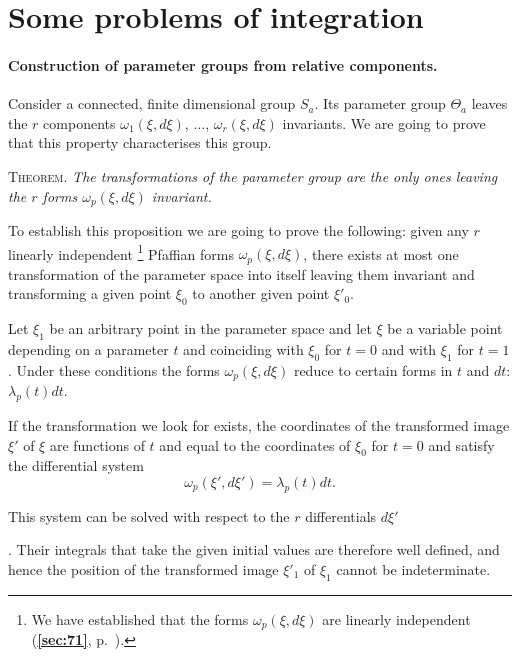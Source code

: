 \documentclass[leqno,11pt]{book}
\numberwithin{equation}{chapter}
\theoremstyle{shape1}
\theoremstyle{shapesmall}
\newcommand{\fsref}[1]{{\rm\textsection\textbf{\ref{sec:#1}}}}
\newcommand{\somespace}{\vspace{9pt}}
\begin{document}
\section{Some problems of integration}
\label{sec:some-probl-integr}

\paragraph{Construction of parameter groups from relative components.}
\label{sec:83}
Consider a connected, finite dimensional group $S_{a}$. Its parameter group $\Theta_{a}$ leaves the $r$ components $\omega_{1}(\xi,d\xi)$, $\dots$, $\omega_{r}(\xi,d\xi)$ invariants. We are going to prove that this property characterises this group.

\somespace

\textsc{Theorem.} \emph{The transformations of the parameter group are the only ones leaving the $r$ forms $\omega_{p}(\xi,d\xi)$ invariant.}

\somespace

To establish this proposition we are going to prove the following: given any $r$ linearly independent \footnote{We have established that the forms $\omega_{p}(\xi,d\xi)$ are linearly independent (\fsref{71}, p.~\pageref{sec:71}).} Pfaffian forms $\omega_{p}(\xi,d\xi)$, there exists at most one transformation of the parameter space into itself leaving them invariant and transforming a given point $\xi_{0}$ to another given point $\xi'_{0}$.

Let $\xi_{1}$ be an arbitrary point in the parameter space and let $\xi$ be a variable point depending on a parameter $t$ and coinciding with $\xi_{0}$ for $t=0$ and with $\xi_{1}$ for $t=1$. Under these conditions the forms $\omega_{p}(\xi,d\xi)$ reduce to certain forms in $t$ and $dt$: $\lambda_{p}(t)dt$.

If the transformation we look for exists, the coordinates of the transformed image $\xi'$ of $\xi$ are functions of $t$ and equal to the coordinates of $\xi_{0}$ for $t=0$ and satisfy the differential system
\[
\omega_{p}(\xi',d\xi')=\lambda_{p}(t)dt.
\]

This system can be solved with respect to the $r$ differentials $d\xi'$ \addtocounter{footnote}{-1}\footnotemark. Their integrals that take the given initial values are therefore well defined, and hence the position of the transformed image $\xi'_{1}$ of $\xi_{1}$ cannot be indeterminate.

\somespace
\end{document}
